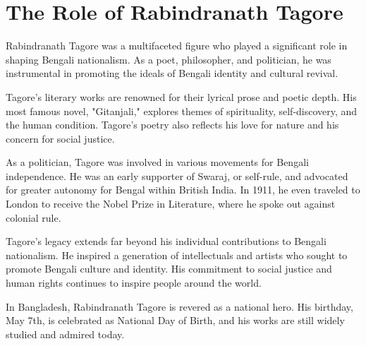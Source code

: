 \chapter{The Role of Rabindranath Tagore}

Rabindranath Tagore was a multifaceted figure who played a significant role in shaping Bengali nationalism. As a poet, philosopher, and politician, he was instrumental in promoting the ideals of Bengali identity and cultural revival.

Tagore's literary works are renowned for their lyrical prose and poetic depth. His most famous novel, "Gitanjali," explores themes of spirituality, self-discovery, and the human condition. Tagore's poetry also reflects his love for nature and his concern for social justice.

As a politician, Tagore was involved in various movements for Bengali independence. He was an early supporter of Swaraj, or self-rule, and advocated for greater autonomy for Bengal within British India. In 1911, he even traveled to London to receive the Nobel Prize in Literature, where he spoke out against colonial rule.

Tagore's legacy extends far beyond his individual contributions to Bengali nationalism. He inspired a generation of intellectuals and artists who sought to promote Bengali culture and identity. His commitment to social justice and human rights continues to inspire people around the world.

In Bangladesh, Rabindranath Tagore is revered as a national hero. His birthday, May 7th, is celebrated as National Day of Birth, and his works are still widely studied and admired today.
